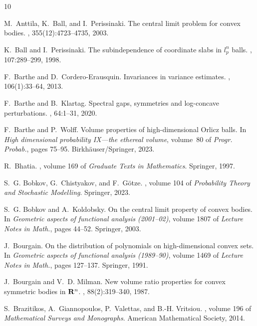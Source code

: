 \documentclass[12pt,a4paper]{article}
\theoremstyle{definition}
\begin{document}
\begin{thebibliography}{10}

M.~Anttila, K.~Ball, and I.~Perissinaki.
\newblock The central limit problem for convex bodies.
, 355(12):4723--4735, 2003.

K.~Ball and I.~Perissinaki.
\newblock The subindependence of coordinate slabs in {$l^n_p$} balls.
, 107:289--299, 1998.

F.~Barthe and D.~Cordero-Erausquin.
\newblock Invariances in variance estimates.
, 106(1):33--64, 2013.

F.~Barthe and B.~Klartag.
\newblock Spectral gaps, symmetries and log-concave perturbations.
, 64:1--31, 2020.

F.~Barthe and P.~Wolff.
\newblock Volume properties of high-dimensional {O}rlicz balls.
\newblock In {\em High dimensional probability {IX}---the ethereal volume},
  volume~80 of {\em Progr. Probab.}, pages 75--95. Birkh\"auser/Springer, 2023.

R.~Bhatia.
, volume 169 of {\em Graduate Texts in
  Mathematics}.
\newblock Springer, 1997.

S.~G. Bobkov, G.~Chistyakov, and F.~G\"{o}tze.
,
  volume 104 of {\em Probability Theory and Stochastic Modelling}.
\newblock Springer, 2023.

S.~G. Bobkov and A.~Koldobsky.
\newblock On the central limit property of convex bodies.
\newblock In {\em Geometric aspects of functional analysis (2001--02)}, volume
  1807 of {\em Lecture Notes in Math.}, pages 44--52. Springer, 2003.

J.~Bourgain.
\newblock On the distribution of polynomials on high-dimensional convex sets.
\newblock In {\em Geometric aspects of functional analysis (1989--90)}, volume
  1469 of {\em Lecture Notes in Math.}, pages 127--137. Springer, 1991.

J.~Bourgain and V.~D. Milman.
\newblock New volume ratio properties for convex symmetric bodies in {${\bf
  R}^n$}.
, 88(2):319--340, 1987.

S.~Brazitikos, A.~Giannopoulos, P.~Valettas, and B.-H. Vritsiou.
, volume 196 of {\em
  Mathematical Surveys and Monographs}.
\newblock American Mathematical Society, 2014.


\end{thebibliography}
\end{document}
